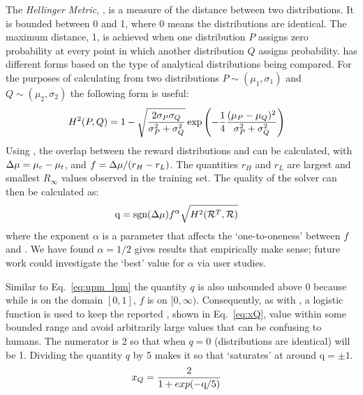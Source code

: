 The \emph{Hellinger Metric}, \hell{},  is a measure of the distance between two distributions. It is bounded between 0 and 1, where 0 means the distributions are identical. The maximum distance, 1, is achieved when one distribution $P$ assigns zero probability at every point in which another distribution $Q$ assigns probability. \hell{} has different forms based on the type of analytical distributions being compared. For the purposes of calculating \xQ{} from two distributions $P \sim (\mu_1,\sigma_1)$ and $Q\sim(\mu_2,\sigma_2)$ the following form is useful:
\begin{align}
    H^2(P,Q) &= 1-\sqrt{\frac{2\sigma_P\sigma_Q}{\sigma_P^2+\sigma_Q^2}}\exp{\left(-\frac{1}{4}\frac{(\mu_P-\mu_Q)^2}{\sigma_P^2+\sigma_Q^2}\right)}
\end{align}
Using \hell{}, the overlap between the reward distributions \rwdtrustpredict{} and \rwdcandsim{} can be calculated, with $\Delta \mu= \mu_c-\mu_t$, and $f = \Delta \mu/(r_H-r_L)$. The quantities $r_H$ and $r_L$ are largest and smallest $R_{\infty}$ values observed in the \surrogate{} training set. The quality of the solver can then be calculated as:
\begin{align}
    \text{q} &= \text{sgn}(\dmu)f^{\alpha}\sqrt{H^{2}(\rwdtrust,\rwd)} \label{eq:q}
\end{align}
\noindent where the exponent $\alpha$ is a parameter that affects the `one-to-oneness' between $f$ and \hell{}. 
We have found $\alpha=1/2$ gives results that empirically make sense; future work could investigate the `best' value for $\alpha$ via user studies.

Similar to Eq.~\ref{eq:upm_lpm} the quantity $q$ is also unbounded above $0$ because while \hell{} is on the domain $[0,1]$, $f$ is on $[0,\infty)$. Consequently, as with \xO{}, a logistic function is used to keep the reported \xQ{}, shown in Eq.~\ref{eq:xQ}, value within some bounded range and avoid arbitrarily large values that can be confusing to humans. The numerator is 2 so that when $q=0$ (distributions are identical) \xQ{} will be 1. Dividing the quantity $q$ by 5 makes it so that \xQ{} `saturates' at around $\text{q}=\pm1$.
    \begin{align}
        \xQ &= \frac{2}{1+exp(-\text{q}/5)}\label{eq:xQ}
    \end{align}

